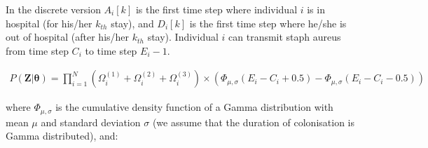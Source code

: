 \documentclass[10pt]{article}
\begin{document}
In the discrete version $A_i[k]$ is the first time step where individual $i$ is in hospital (for his/her $k_{th}$ stay), and $D_i[k]$ is the first time step where he/she is out of hospital (after his/her $k_{th}$ stay). Individual $i$ can transmit staph aureus from time step $C_i$ to time step $E_i-1$. 

\begin{eqnarray*}
P\left(\bm{Z}|\bm{\theta}\right) = 
\bm{\prod}_{i=1}^N %
\left( \Omega_i^{\left(1\right)} + \Omega_i^{\left(2\right)} + \Omega_i^{\left(3\right)} \right) \times \left(\Phi_{\mu,\sigma}\left(E_i-C_i+0.5\right) - \Phi_{\mu,\sigma}\left(E_i-C_i-0.5\right) \right)
\end{eqnarray*}

\noindent where $\Phi_{\mu,\sigma}$ is the cumulative density function of a Gamma distribution with mean $\mu$ and standard deviation $\sigma$ (we assume that the duration of colonisation is Gamma distributed), and: 
\end{document}
